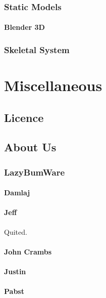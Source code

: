 \documentclass[a4paper]{report}
\begin{document}
		\section{Static Models}

			\subsection{Blender 3D}

		\section{Skeletal System}

\part{Miscellaneous}

	\chapter{Licence}

	\chapter{About Us}

		\section{LazyBumWare}

			\subsection{Damlaj}

			\subsection{Jeff}

				Quited.

			\subsection{John Crambs}

			\subsection{Justin}

			\subsection{Pabst}
\end{document}
